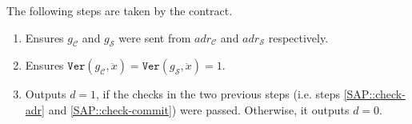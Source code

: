 \begin{enumerate}
 
 The following steps are taken   by  the contract.
   \begin{enumerate}
   
\item\label{SAP::check-adr} Ensures $g_{\scriptscriptstyle\mathcal C}$ and $g_{\scriptscriptstyle\mathcal S}$ were sent from   $adr_{\scriptscriptstyle \mathcal{C}}$ and  $adr_{\scriptscriptstyle \mathcal{S}}$  respectively. 
  
   \item\label{SAP::check-commit} Ensures $\mathtt{Ver}(g_{\scriptscriptstyle\mathcal C},\ddot{x})=\mathtt{Ver}(g_{\scriptscriptstyle\mathcal S},\ddot{x}) =1$.
   
   \item Outputs $d=1$, if the checks in the two previous steps (i.e. steps \ref{SAP::check-adr} and \ref{SAP::check-commit}) were passed. Otherwise, it outputs $d=0$.
    \end{enumerate}
 \end{enumerate}

  
  
  
  
%



